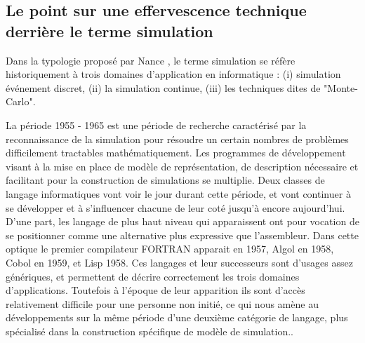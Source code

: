 \subsection{Le point sur une effervescence technique derrière le terme simulation}


Dans la typologie proposé par Nance \autocite{Nance1993}, le terme simulation se réfère historiquement à trois domaines d'application en informatique : (i) simulation événement discret, (ii) la simulation continue, (iii) les techniques dites de "Monte-Carlo".

La période 1955 - 1965 est une période de recherche caractérisé par la reconnaissance de la simulation pour résoudre un certain nombres de problèmes difficilement tractables mathématiquement.\autocite{Nance1993, Ackoff1961} Les programmes de développement visant à la mise en place de modèle de représentation, de description nécessaire et facilitant pour la construction de simulations se multiplie. Deux classes de langage informatiques vont voir le jour durant cette période, et vont continuer à se développer et à s'influencer chacune de leur coté jusqu'à encore aujourd'hui. D'une part, les langage de plus haut niveau qui apparaissent ont pour vocation de se positionner comme une alternative plus expressive que l'assembleur. Dans cette optique le premier compilateur FORTRAN apparait en 1957,  Algol en 1958, Cobol en 1959, et Lisp 1958. Ces langages et leur successeurs sont d'usages assez génériques, et permettent de décrire correctement les trois domaines d'applications. Toutefois à l'époque de leur apparition ils sont d'accès relativement difficile pour une personne non initié, ce qui nous amène au développements sur la même période d'une deuxième catégorie de langage, plus spécialisé dans la construction spécifique de modèle de simulation.. \autocite[239]{Naylor1966}

